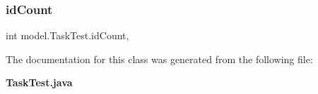 \subsubsection{id\+Count}
{\footnotesize\ttfamily int model.\+Task\+Test.\+id\+Count\hspace{0.3cm}{\ttfamily [static]}, {\ttfamily [private]}}



The documentation for this class was generated from the following file\+:\begin{DoxyCompactItemize}
\item 
\textbf{ Task\+Test.\+java}\end{DoxyCompactItemize}
